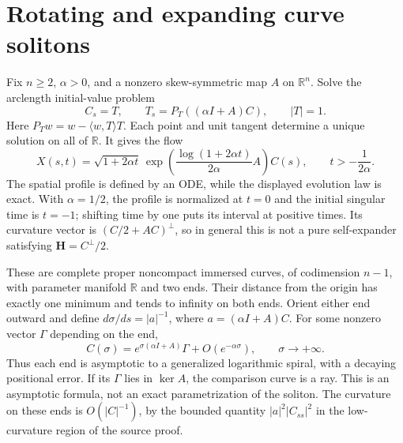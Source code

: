\chapter{Rotating and expanding curve solitons}\label{sec:catalogue-rotating-expanding-curves}
\begin{example}\label{ex:catalogue-rotating-expanding-curves}
Fix $n\geq2$, $\alpha>0$, and a nonzero skew-symmetric map $A$ on $\mathbb R^n$. Solve the arclength initial-value problem
\[
 C_s=T,\qquad T_s=P_T((\alpha I+A)C),\qquad |T|=1.
\]
Here $P_Tw=w-\langle w,T\rangle T$. Each point and unit tangent determine a unique solution on all of $\mathbb R$. It gives the flow
\[
 X(s,t)=\sqrt{1+2\alpha t}\,
 \exp\left(\frac{\log(1+2\alpha t)}{2\alpha}A\right)C(s),
 \qquad t>-\frac1{2\alpha}.
\]
The spatial profile is defined by an ODE, while the displayed evolution law is exact. With $\alpha=1/2$, the profile is normalized at $t=0$ and the initial singular time is $t=-1$; shifting time by one puts its interval at positive times. Its curvature vector is $(C/2+AC)^\perp$, so in general this is not a pure self-expander satisfying $\mathbf H=C^\perp/2$.

These are complete proper noncompact immersed curves, of codimension $n-1$, with parameter manifold $\mathbb R$ and two ends. Their distance from the origin has exactly one minimum and tends to infinity on both ends. Orient either end outward and define $d\sigma/ds=|a|^{-1}$, where $a=(\alpha I+A)C$. For some nonzero vector $\Gamma$ depending on the end,
\[
 C(\sigma)=e^{\sigma(\alpha I+A)}\Gamma+O(e^{-\alpha\sigma}),
 \qquad \sigma\longrightarrow+\infty.
\]
Thus each end is asymptotic to a generalized logarithmic spiral, with a decaying positional error. If its $\Gamma$ lies in $\ker A$, the comparison curve is a ray. This is an asymptotic formula, not an exact parametrization of the soliton. The curvature on these ends is $O(|C|^{-1})$, by the bounded quantity $|a|^2|C_{ss}|^2$ in the low-curvature region of the source proof.


\end{example}

